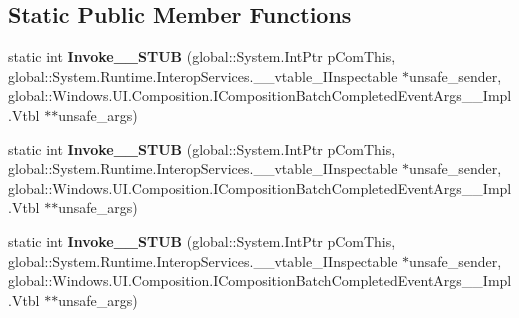 \subsection*{Static Public Member Functions}
\begin{DoxyCompactItemize}
\item 
\mbox{\label{struct_windows_1_1_foundation_1_1_typed_event_handler___a___system___object__j___windows___u_i__c6631eed6bac8896fe4382b061b4296d_a6b013f211e3b6fd706ecb81801ff0463}} 
static int {\bfseries Invoke\+\_\+\+\_\+\+S\+T\+UB} (global\+::\+System.\+Int\+Ptr p\+Com\+This, global\+::\+System.\+Runtime.\+Interop\+Services.\+\_\+\+\_\+vtable\+\_\+\+I\+Inspectable $\ast$unsafe\+\_\+sender, global\+::\+Windows.\+U\+I.\+Composition.\+I\+Composition\+Batch\+Completed\+Event\+Args\+\_\+\+\_\+\+Impl.\+Vtbl $\ast$$\ast$unsafe\+\_\+args)
\item 
\mbox{\label{struct_windows_1_1_foundation_1_1_typed_event_handler___a___system___object__j___windows___u_i__c6631eed6bac8896fe4382b061b4296d_a6b013f211e3b6fd706ecb81801ff0463}} 
static int {\bfseries Invoke\+\_\+\+\_\+\+S\+T\+UB} (global\+::\+System.\+Int\+Ptr p\+Com\+This, global\+::\+System.\+Runtime.\+Interop\+Services.\+\_\+\+\_\+vtable\+\_\+\+I\+Inspectable $\ast$unsafe\+\_\+sender, global\+::\+Windows.\+U\+I.\+Composition.\+I\+Composition\+Batch\+Completed\+Event\+Args\+\_\+\+\_\+\+Impl.\+Vtbl $\ast$$\ast$unsafe\+\_\+args)
\item 
\mbox{\label{struct_windows_1_1_foundation_1_1_typed_event_handler___a___system___object__j___windows___u_i__c6631eed6bac8896fe4382b061b4296d_a6b013f211e3b6fd706ecb81801ff0463}} 
static int {\bfseries Invoke\+\_\+\+\_\+\+S\+T\+UB} (global\+::\+System.\+Int\+Ptr p\+Com\+This, global\+::\+System.\+Runtime.\+Interop\+Services.\+\_\+\+\_\+vtable\+\_\+\+I\+Inspectable $\ast$unsafe\+\_\+sender, global\+::\+Windows.\+U\+I.\+Composition.\+I\+Composition\+Batch\+Completed\+Event\+Args\+\_\+\+\_\+\+Impl.\+Vtbl $\ast$$\ast$unsafe\+\_\+args)
\item 
\mbox{\label{struct_windows_1_1_foundation_1_1_typed_event_handler___a___system___object__j___windows___u_i__c6631eed6bac8896fe4382b061b4296d_a6b013f211e3b6fd706ecb81801ff0463}} 
$$
\end{DoxyCompactItemize}
